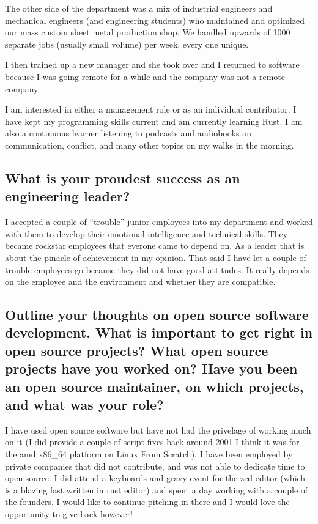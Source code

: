 \documentclass[letter,12pt]{article}
\begin{document}
The other side of the department was a mix of industrial engineers and mechanical engineers (and engineering students) who maintained and optimized our mass custom sheet metal production shop. We handled upwards of 1000 separate jobs (usually small volume) per week, every one unique.

I then trained up a new manager and she took over and I returned to software because I was going remote for a while and the company was not a remote company.

I am interested in either a management role or as an individual contributor. I have kept my programming skills current and am currently learning Rust. I am also a continuous learner listening to podcasts and audiobooks on communication, conflict, and many other topics on my walks in the morning.

\subsection{What is your proudest success as an engineering leader?}
I accepted a couple of ``trouble'' junior employees into my department and worked with them to develop their emotional intelligence and technical skills. They became rockstar employees that everone came to depend on. As a leader that is about the pinacle of achievement in my opinion. That said I have let a couple of trouble employees go because they did not have good attitudes. It really depends on the employee and the environment and whether they are compatible.

\subsection{Outline your thoughts on open source software development. What is important to get right in open source projects? What open source projects have you worked on? Have you been an open source maintainer, on which projects, and what was your role?}
I have used open source software but have not had the privelage of working much on it (I did provide a couple of script fixes back around 2001 I think it was for the amd x86\_64 platform on Linux From Scratch). I have been employed by private companies that did not contribute, and was not able to dedicate time to open source. I did attend a keyboards and gravy event for the zed editor (which is a blazing fast written in rust editor) and spent a day working with a couple of the founders. I would like to continue pitching in there and I would love the opportunity to give back however!
\end{document}
